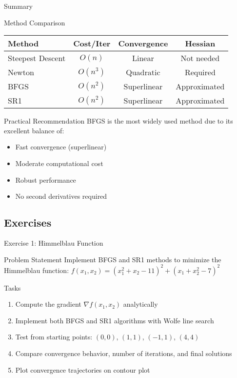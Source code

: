 \documentclass[aspectratio=1610]{beamer}
\begin{document}
\begin{frame}{Summary}
  \begin{block}{Method Comparison}
    \begin{center}
    \begin{tabular}{|l|c|c|c|}
    \hline
    Method & Cost/Iter & Convergence & Hessian \\
    \hline
    Steepest Descent & $O(n)$ & Linear & Not needed \\
    Newton & $O(n^3)$ & Quadratic & Required \\
    BFGS & $O(n^2)$ & Superlinear & Approximated \\
    SR1 & $O(n^2)$ & Superlinear & Approximated \\
    \hline
    \end{tabular}
    \end{center}
  \end{block}
  
  \vspace{0.5cm}
  \begin{block}{Practical Recommendation}
    BFGS is the most widely used method due to its excellent balance of:
    \begin{itemize}
      \item Fast convergence (superlinear)
      \item Moderate computational cost
      \item Robust performance
      \item No second derivatives required
    \end{itemize}
  \end{block}
\end{frame}

\subsection{Exercises}

\begin{frame}{Exercise 1: Himmelblau Function}
  \begin{block}{Problem Statement}
    Implement BFGS and SR1 methods to minimize the Himmelblau function:
    $f(x_1, x_2) = (x_1^2 + x_2 - 11)^2 + (x_1 + x_2^2 - 7)^2$
  \end{block}
  
  \vspace{0.5cm}
  \begin{block}{Tasks}
    \begin{enumerate}
      \item Compute the gradient $\nabla f(x_1, x_2)$ analytically
      \item Implement both BFGS and SR1 algorithms with Wolfe line search
      \item Test from starting points: $(0, 0)$, $(1, 1)$, $(-1, 1)$, $(4, 4)$
      \item Compare convergence behavior, number of iterations, and final solutions
      \item Plot convergence trajectories on contour plot
    \end{enumerate}
  \end{block}
  
\end{frame}
\end{document}
